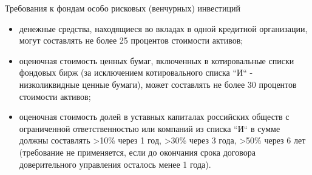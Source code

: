 \documentclass[_Venture_p1.tex]{subfiles}
\begin{document}
\begin{frame}[allowframebreaks]{\setfontsize{12pt}Требования к фондам особо рисковых (венчурных) инвестиций}
\begin{itemize}
	\item денежные средства, находящиеся во вкладах в одной кредитной организации, могут составлять не более 25 процентов стоимости активов;
	\item оценочная стоимость ценных бумаг, включенных в котировальные списки фондовых бирж (за исключением котировального списка ``И`` - низколиквидные ценные бумаги), может составлять не более 30 процентов стоимости активов;
	
	\pagebreak
	\item оценочная стоимость долей в уставных капиталах российских обществ с ограниченной ответственностью или компаний из списка ``И`` в сумме должны составлять >10\% через 1 год, >30\% через 3 года, >50\% через 6 лет (требование не применяется, если до окончания срока договора доверительного управления осталось менее 1 года).	
\end{itemize}
\end{frame}
\end{document}
